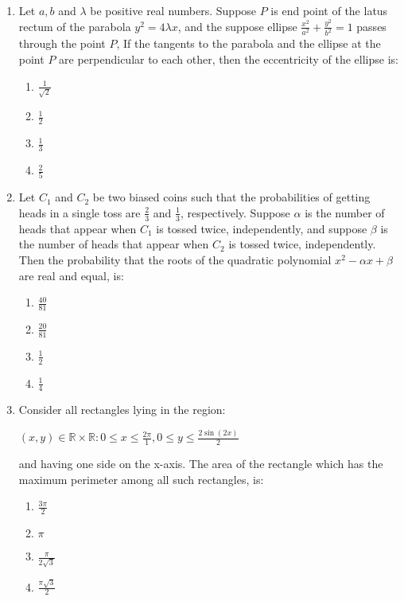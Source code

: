 \documentclass{article}
\begin{document}
\begin{enumerate}
\item  Let $a, b$ and $\lambda$ be positive real numbers. Suppose $P$ is end point of the latus rectum of the parabola $y^2 = 4\lambda x$, and the suppose ellipse $\frac{x^2}{a^2} + \frac{y^2}{b^2} = 1$ passes through the point $P$, If the tangents to the parabola and the ellipse at the point $P$ are perpendicular to each other, then the eccentricity of the ellipse is:

    \begin{enumerate}
        \item  $\frac{1}{\sqrt{2}}$
        \item  $\frac{1}{2}$
        \item  $\frac{1}{3}$
        \item  $\frac{2}{5}$
    \end{enumerate}

\item  Let $C_1$ and $C_2$ be two biased coins such that the probabilities of getting heads in a single toss are $\frac{2}{3}$ and $\frac{1}{3}$, respectively. Suppose $\alpha$ is the number of heads that appear when $C_1$ is tossed twice, independently, and suppose $\beta$ is the number of heads that appear when $C_2$ is tossed twice, independently. Then the probability that the roots of the quadratic polynomial $x^2 - \alpha x +\beta$ are real and equal, is:

    \begin{enumerate}
        \item  $\frac{40}{81}$
        \item  $\frac{20}{81}$
        \item  $\frac{1}{2}$
        \item  $\frac{1}{4}$
    \end{enumerate}

\item  Consider all rectangles lying in the region:

\begin{center}
	$ {(x,y) \in \mathbb{R} \times \mathbb{R} : 0 \leq x \leq \frac{2\pi} 1, 0 \leq y \leq \frac{2\sin(2x)}{2}}$
\end{center}

    and having one side on the x-axis. The area of the rectangle which has the maximum perimeter among all such rectangles, is:

    \begin{enumerate}
        \item  $\frac{3\pi}{2}$
        \item  $\pi$
        \item  $\frac{\pi}{2\sqrt{3}}$
        \item  $\frac{\pi\sqrt{3}}{2}$
    \end{enumerate}


\end{enumerate}
\end{document}
